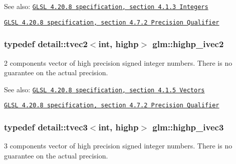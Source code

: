 \begin{Desc}
\item[See also:]\href{http://www.opengl.org/registry/doc/GLSLangSpec.4.20.8.pdf}{\tt GLSL 4.20.8 specification, section 4.1.3 Integers} 

\href{http://www.opengl.org/registry/doc/GLSLangSpec.4.20.8.pdf}{\tt GLSL 4.20.8 specification, section 4.7.2 Precision Qualifier} \end{Desc}
\hypertarget{group__core__precision_gb2bac6095f51f7d7f74747afc2f6747a}{
\subsubsection[highp\_\-ivec2]{\setlength{\rightskip}{0pt plus 5cm}typedef detail::tvec2$<$int, highp$>$ {\bf glm::highp\_\-ivec2}}}
\label{group__core__precision_gb2bac6095f51f7d7f74747afc2f6747a}


2 components vector of high precision signed integer numbers. There is no guarantee on the actual precision.

\begin{Desc}
\item[See also:]\href{http://www.opengl.org/registry/doc/GLSLangSpec.4.20.8.pdf}{\tt GLSL 4.20.8 specification, section 4.1.5 Vectors} 

\href{http://www.opengl.org/registry/doc/GLSLangSpec.4.20.8.pdf}{\tt GLSL 4.20.8 specification, section 4.7.2 Precision Qualifier} \end{Desc}
\hypertarget{group__core__precision_ge9f0a321de8ee92dce9d4400362d71e7}{
\subsubsection[highp\_\-ivec3]{\setlength{\rightskip}{0pt plus 5cm}typedef detail::tvec3$<$int, highp$>$ {\bf glm::highp\_\-ivec3}}}
\label{group__core__precision_ge9f0a321de8ee92dce9d4400362d71e7}


3 components vector of high precision signed integer numbers. There is no guarantee on the actual precision.

